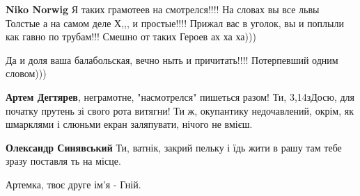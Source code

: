 \begin{itemize}
\begin{itemize}
\begin{itemize}
 
\textbf{Niko Norwig} Я таких грамотеев на смотрелся!!!! На словах вы все львы
Толстые а на самом деле Х,,, и простые!!!! Прижал вас в уголок, вы и поплыли
как гавно по трубам!!! Смешно от таких Героев ах ха ха)))

 
Да и доля ваша балабольская, вечно ныть и причитать!!!! Потерпевший одним словом)))

\end{itemize}

 
\textbf{Артем Дегтярев}, неграмотне, "насмотрелся" пишеться разом! Ти, 3,14зДосю, для початку прутень зі свого рота витягни! Ти ж, окупантику недочавлений, окрім, як шмарклями і слюньми екран заляпувати, нічого не вмієш. \Smiley[1.0][yellow]

 
\textbf{Олександр Синявський} Ти, ватнік, закрий пельку і їдь жити в рашу там тебе зразу поставля ть на місце.

 
Артемка, твоє друге ім'я - Гній.

\end{itemize}


\end{itemize}
